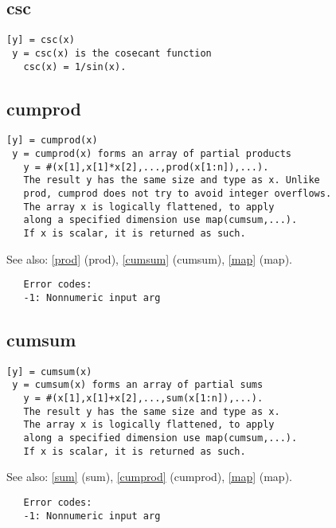 \documentclass[a4paper]{article}
\begin{document}
\subsection{csc\label{csc}}

\begin{tscreen}
\begin{verbatim}
[y] = csc(x)
 y = csc(x) is the cosecant function
   csc(x) = 1/sin(x). 
\end{verbatim}
\end{tscreen}





\subsection{cumprod\label{cumprod}}

\begin{tscreen}
\begin{verbatim}
[y] = cumprod(x)
 y = cumprod(x) forms an array of partial products
   y = #(x[1],x[1]*x[2],...,prod(x[1:n]),...).
   The result y has the same size and type as x. Unlike
   prod, cumprod does not try to avoid integer overflows.
   The array x is logically flattened, to apply
   along a specified dimension use map(cumsum,...).
   If x is scalar, it is returned as such.
\end{verbatim}

See also: \ref{prod} {(prod)}, \ref{cumsum} {(cumsum)}, \ref{map} {(map)}.
\begin{verbatim}
   Error codes:
   -1: Nonnumeric input arg 
\end{verbatim}
\end{tscreen}





\subsection{cumsum\label{cumsum}}

\begin{tscreen}
\begin{verbatim}
[y] = cumsum(x)
 y = cumsum(x) forms an array of partial sums
   y = #(x[1],x[1]+x[2],...,sum(x[1:n]),...).
   The result y has the same size and type as x.
   The array x is logically flattened, to apply
   along a specified dimension use map(cumsum,...).
   If x is scalar, it is returned as such.
\end{verbatim}

See also: \ref{sum} {(sum)}, \ref{cumprod} {(cumprod)}, \ref{map} {(map)}.
\begin{verbatim}
   Error codes:
   -1: Nonnumeric input arg 
\end{verbatim}
\end{tscreen}
\end{document}
